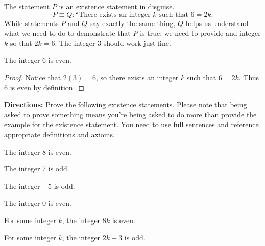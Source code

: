 \noindent The statement $P$ is an existence statement in disguise.  
\[P \equiv Q:\text{``There exists an integer $k$ such that $6=2k$.}\]
While statements $P$ and $Q$ say exactly the same thing, $Q$ helps us understand what we need to do to demonstrate that $P$ is true: we need to provide and integer $k$ so that $2k=6$.  The integer $3$ should work just fine.

\begin{claim} The integer 6 is even.
\end{claim}
\begin{proof}
Notice that $2(3)=6$, so there exists an integer $k$ such that $6=2k$.  Thus 6 is even by definition.
\end{proof}

\begin{question}
\item \textbf{Directions:} Prove the following existence statements.  Please note that being asked to prove something means you're being asked to do more than provide the example for the existence statement.  You need to use full sentences and reference appropriate definitions and axioms.
\end{question}
\begin{claim} The integer $8$ is even.
\end{claim}

\vspace{1.5in}

\begin{claim} The integer 7 is odd.
\end{claim}

\vspace{1.5in}

\begin{claim} The integer $-5$ is odd.
\end{claim}

\vspace{1.5in}

\begin{claim} The integer $0$ is even.
\end{claim}

\vspace{1.5in}

\begin{claim}  For some integer $k$, the integer $8k$ is even.
\end{claim}

\vspace{1.5in}

\begin{claim} For some integer $k$, the integer $2k+3$ is odd.
\end{claim}

